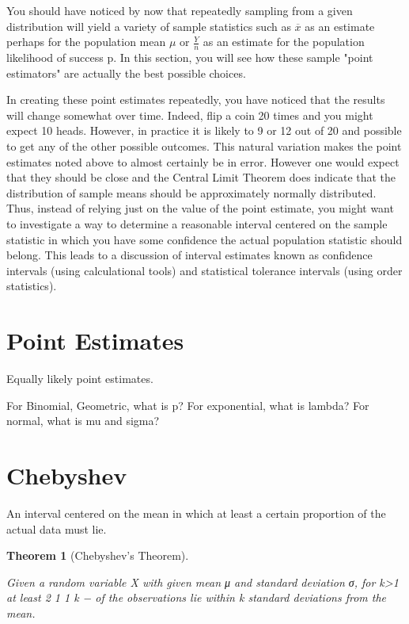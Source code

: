 \documentclass[10pt,]{book}
\theoremstyle{plain}
\newtheorem{theorem}{Theorem}[section]
\theoremstyle{definition}
\theoremstyle{definition}
\theoremstyle{definition}
\numberwithin{equation}{section}
\begin{document}
You should have noticed by now that repeatedly sampling from a given distribution will yield a variety of sample statistics such as \(\overline{x}\) as an estimate perhaps for the population mean \(\mu\) or \(\frac{Y}{n}\) as an estimate for the population likelihood of success p. In this section, you will see how these sample "point estimators" are actually the best possible choices.
%
\par

In creating these point estimates repeatedly, you have noticed that the results will change somewhat over time. Indeed, flip a coin 20 times and you might expect 10 heads. However, in practice it is likely to 9 or 12 out of 20 and possible to get any of the other possible outcomes. This natural variation makes the point estimates noted above to almost certainly be in error. However one would expect that they should be close and the Central Limit Theorem does indicate that the distribution of sample means should be approximately normally distributed. Thus, instead of relying just on the value of the point estimate, you might want to investigate a way to determine a reasonable interval centered on the sample statistic in which you have some confidence the actual population statistic should belong. This leads to a discussion of interval estimates known as confidence intervals (using calculational tools) and statistical tolerance intervals (using order statistics).
%
\typeout{************************************************}
\typeout{************************************************}
\section[Point Estimates]{Point Estimates}\label{section-40}

Equally likely point estimates.
%
\par

For Binomial, Geometric, what is p? For exponential, what is lambda?  For normal, what is mu and sigma?
%
\typeout{************************************************}
\typeout{************************************************}
\section[Chebyshev]{Chebyshev}\label{section-41}
An interval centered on the mean in which at least a certain proportion
	of the actual data must lie.
\begin{theorem}[Chebyshev's Theorem]\label{theorem-36}

	Given a random variable X with given mean μ and standard deviation σ, for k>1 at least
	2
	1 1
	k − of the observations lie within k standard deviations from the mean.
	\end{theorem}
\typeout{************************************************}
\typeout{************************************************}
\end{document}

